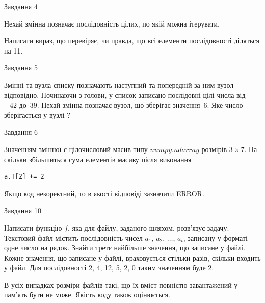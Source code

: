 \documentclass[12pt, ukrainian]{article}
\begin{document}
{               
{\begin{center}Завдання {4}\end{center}}
\vspace{-6mm}
Нехай змінна  позначає послідовність цілих, по якій можна ітерувати.

Написати вираз, що перевіряє, чи правда, що всі елементи послідовності діляться на 11.\par

\vspace{10mm}
               
{\begin{center}Завдання {5}\end{center}}
\vspace{-6mm}
Змінні  та  вузла списку позначають наступний та попередній за ним вузол відповідно. Починаючи з голови, у список записано послідовні цілі числа від~$-42$ до~$39$. Нехай змінна  позначає вузол, що зберігає значення~$6$.
Яке число зберігається у вузлі  ?\par

               
{\begin{center}Завдання {6}\end{center}}
\vspace{-6mm}
Значенням змінної  є цілочисловий масив типу $numpy.ndarray$ розмірів $3{\times}7$. На скільки збільшиться сума елементів масиву  після виконання
\begin{verbatim}
a.T[2] += 2
\end{verbatim}


Якщо код некоректний, то в якості відповіді зазначити ERROR.\par

               
{\begin{center}Завдання {10}\end{center}}
\vspace{-6mm}

Написати функцію $f$, яка для файлу, заданого шляхом, розв’язує задачу:\\ Текстовий файл містить послідовність чисел $a_1$, $a_2$, $\ldots$, $a_t$, записану у форматі одне число на рядок. Знайти третє найбільше значення, що записане у файлі. Кожне значення, що записане у файлі, враховується стільки разів, скільки входить у файл. Для послідовності 2, 4, 12, 5, 2, 0 таким значенням буде 2.

В усіх випадках розміри файлів такі, що їх вміст повністю завантажений у пам'ять бути не може. Якість коду також оцінюється.



}
\end{document}
